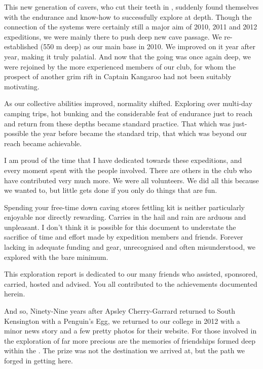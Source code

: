 This new generation of cavers, who cut their teeth in ,
suddenly found themselves with the endurance and know-how to
successfully explore at depth. Though the connection of the systems were
certainly still a major aim of 2010, 2011 and 2012 expeditions, we were
mainly there to push deep new cave passage. We re-established  (550 m deep) as our main base in 2010. We improved on it year after
year, making it truly palatial. And now that the going was once again
deep, we were rejoined by the more experienced members of our club, for
whom the prospect of another grim rift in Captain Kangaroo had not been
suitably motivating.

As our collective abilities improved, normality shifted. Exploring over
multi-day camping trips, hot bunking and the considerable feat of
endurance just to reach and return from these depths became standard
practice. That which was just-possible the year before became the
standard trip, that which was beyond our reach became achievable.

I am proud of the time that I have dedicated towards these expeditions,
and every moment spent with the people involved. There are others in the
club who have contributed very much more. We were all volunteers. We did
all this because we wanted to, but little gets done if you only do
things that are fun.

Spending your free-time down caving stores fettling kit is neither
particularly enjoyable nor directly rewarding. Carries in the hail and
rain are arduous and unpleasant. I don't think it is possible for this
document to understate the sacrifice of time and effort made by
expedition members and friends. Forever lacking in adequate funding and
gear, unrecognised and often misunderstood, we explored with the bare
minimum.

This exploration report is dedicated to our many friends who assisted,
sponsored, carried, hosted and advised. You all contributed to the
achievements documented herein.

And so, Ninety-Nine years after Apsley Cherry-Garrard returned to South
Kensington with a Penguin's Egg, we returned to our college in 2012 with
a minor news story and a few pretty photos for their website. For those
involved in the exploration of  far more precious are
the memories of friendships formed deep within the . The
prize was not the destination we arrived at, but the path we forged in
getting here.

